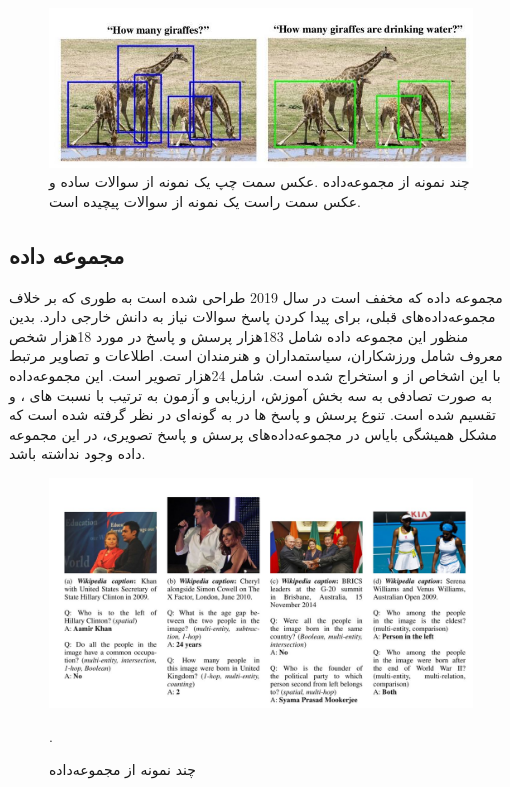    \begin{figure}[h]
		\centerline{\includegraphics[scale=0.8]{images/TallyQA.JPG}}
		\caption{چند نمونه از مجموعه‌داده \cite{acharya2019tallyqa}.عکس سمت چپ یک نمونه از سوالات ساده و عکس سمت راست یک نمونه از سوالات پیچیده است.}
		\label{fig:TallyQAExample}
	\end{figure}

\subsection{مجموعه داده \cite{shah2019kvqa}}
	مجموعه داده 
	 که مخفف
	است در سال 2019 طراحی شده است به طوری که بر خلاف مجموعه‌داده‌های قبلی، برای پیدا کردن پاسخ سوالات نیاز به دانش خارجی دارد. بدین منظور این مجموعه داده شامل 183هزار پرسش و پاسخ در مورد 18هزار شخص معروف شامل ورزشکاران، سیاستمداران و هنرمندان است.  اطلاعات و تصاویر مرتبط با این  اشخاص از
	و
	استخراج شده است.
شامل 24هزار تصویر است. این مجموعه‌داده به صورت تصادفی به سه بخش آموزش، ارزیابی و آزمون به ترتیب با نسبت های
 	، 
  و
   تقسیم شده است. تنوع پرسش و پاسخ ها در 
	به گونه‌ای در نظر گرفته شده است که مشکل همیشگی بایاس در مجموعه‌داده‌های پرسش و پاسخ تصویری، در این مجموعه داده وجود نداشته باشد.
   \begin{figure}[h]
		\centerline{\includegraphics[scale=0.4]{images/KVQA.JPG}}
		\caption{چند نمونه از مجموعه‌داده \cite{shah2019kvqa}}.
		\label{fig:KVQAExample}
    \end{figure}

